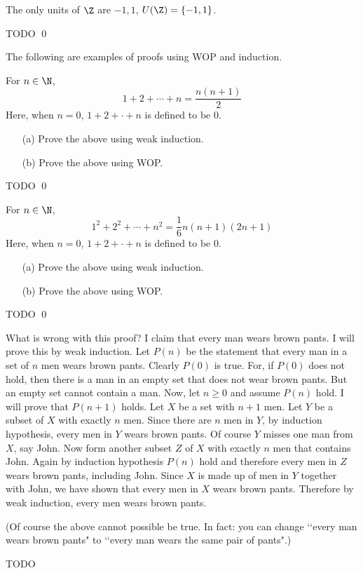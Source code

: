 \begin{prop}
The only units of $\Z$ are $-1, 1$, $U(\Z) = \{-1, 1\}$.
\end{prop}
\proof
TODO
\qed

The following are examples of proofs using WOP and induction.

\begin{ex}
For $n \in \N$,
\[
1 + 2 + \cdots + n = \frac{n(n+1)}{2}
\]
Here, when $n = 0$, $1 + 2 + \cdot + n$ is defined to be $0$.
\begin{enumerate}[nosep]
\item[(a)] Prove the above using weak induction.
\item[(b)] Prove the above using WOP.
\end{enumerate}
\end{ex}
\proof
TODO
\qed


\begin{ex}
For $n \in \N$,
\[
1^2 + 2^2 + \cdots + n^2 = \frac{1}{6}n(n+1)(2n + 1)
\]
Here, when $n = 0$, $1 + 2 + \cdot + n$ is defined to be $0$.
\begin{enumerate}[nosep]
\item[(a)] Prove the above using weak induction.
\item[(b)] Prove the above using WOP.
\end{enumerate}
\end{ex}
\proof
TODO
\qed


\begin{ex}
What is wrong with this proof?
I claim that every man wears brown pants.
I will prove this by weak induction.
Let $P(n)$ be the statement that every man in a set of $n$
men wears brown pants.
Clearly $P(0)$ is true.
For, if $P(0)$ does not hold, then there is a man in an empty set
that does not wear brown pants.
But an empty set cannot contain a man.
Now, let $n \geq 0$ and assume $P(n)$ hold.
I will prove that $P(n + 1)$ holds.
Let $X$ be a set with $n + 1$ men.
Let $Y$ be a subset of $X$ with exactly $n$ men.
Since there are $n$ men in $Y$, by induction hypothesis,
every men in $Y$ wears brown pants.
Of course $Y$ misses one man from $X$, say John.
Now form another subset $Z$ of $X$ with exactly $n$ men that contains John.
Again by induction hypothesis $P(n)$ hold and therefore every men in $Z$
wears brown pants, including John.
Since $X$ is made up of men in $Y$ together with John, we have shown
that every men in $X$ wears brown pants.
Therefore by weak induction, every men wears brown pants.

(Of course the above cannot possible be true.
In fact: you can change \lq\lq every man wears brown pants" to
\lq\lq every man wears the same pair of pants".)
\end{ex}
TODO


